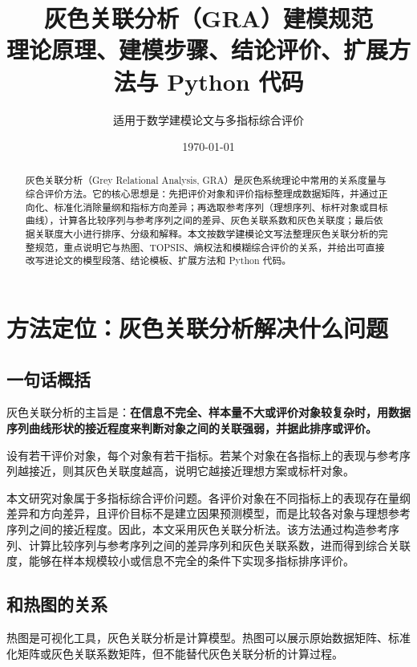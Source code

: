 \documentclass[UTF8,a4paper,11pt]{ctexart}
\title{\heiti 灰色关联分析（GRA）建模规范\\[-2mm]
\large 理论原理、建模步骤、结论评价、扩展方法与 Python 代码}
\author{适用于数学建模论文与多指标综合评价}
\date{\today}
\begin{document}
\sloppy
\maketitle

\begin{abstract}
灰色关联分析（Grey Relational Analysis, GRA）是灰色系统理论中常用的关系度量与综合评价方法。它的核心思想是：先把评价对象和评价指标整理成数据矩阵，并通过正向化、标准化消除量纲和指标方向差异；再选取参考序列（理想序列、标杆对象或目标曲线），计算各比较序列与参考序列之间的差异、灰色关联系数和灰色关联度；最后依据关联度大小进行排序、分级和解释。本文按数学建模论文写法整理灰色关联分析的完整规范，重点说明它与热图、TOPSIS、熵权法和模糊综合评价的关系，并给出可直接改写进论文的模型段落、结论模板、扩展方法和 Python 代码。
\end{abstract}

\tableofcontents
\newpage

\section{方法定位：灰色关联分析解决什么问题}
\subsection{一句话概括}
灰色关联分析的主旨是：\textbf{在信息不完全、样本量不大或评价对象较复杂时，用数据序列曲线形状的接近程度来判断对象之间的关联强弱，并据此排序或评价。}

设有若干评价对象，每个对象有若干指标。若某个对象在各指标上的表现与参考序列越接近，则其灰色关联度越高，说明它越接近理想方案或标杆对象。

\begin{notebox}[论文中可直接使用的表述]
本文研究对象属于多指标综合评价问题。各评价对象在不同指标上的表现存在量纲差异和方向差异，且评价目标不是建立因果预测模型，而是比较各对象与理想参考序列之间的接近程度。因此，本文采用灰色关联分析法。该方法通过构造参考序列、计算比较序列与参考序列之间的差异序列和灰色关联系数，进而得到综合关联度，能够在样本规模较小或信息不完全的条件下实现多指标排序评价。
\end{notebox}

\subsection{和热图的关系}
热图是可视化工具，灰色关联分析是计算模型。热图可以展示原始数据矩阵、标准化矩阵或灰色关联系数矩阵，但不能替代灰色关联分析的计算过程。
\end{document}
